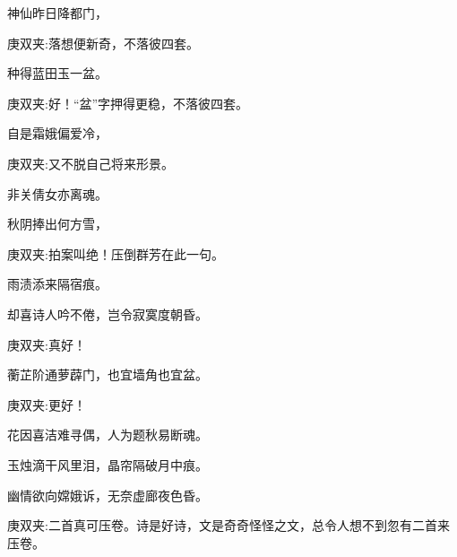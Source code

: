 \begin{poem}
    \begin{pl}神仙昨日降都门，\end{pl}
    \begin{note}庚双夹:落想便新奇，不落彼四套。\end{note}
    \begin{pl}种得蓝田玉一盆。\end{pl}
    \begin{note}庚双夹:好！“盆”字押得更稳，不落彼四套。\end{note}

    \begin{pl}自是霜娥偏爱冷，\end{pl}
    \begin{note}庚双夹:又不脱自己将来形景。\end{note}
    \begin{pl} 非关倩女亦离魂。\end{pl}

    \begin{pl}秋阴捧出何方雪，\end{pl}
    \begin{note}庚双夹:拍案叫绝！压倒群芳在此一句。\end{note}
    \begin{pl}雨渍添来隔宿痕。\end{pl}

    \begin{pl}却喜诗人吟不倦，岂令寂寞度朝昏。\end{pl}
    \begin{note}庚双夹:真好！\end{note}
    \emptypl

    \begin{pl}蘅芷阶通萝薜门，也宜墙角也宜盆。\end{pl}
    \begin{note}庚双夹:更好！\end{note}

    \begin{pl}花因喜洁难寻偶，人为题秋易断魂。\end{pl}

    \begin{pl}玉烛滴干风里泪，晶帘隔破月中痕。\end{pl}

    \begin{pl}幽情欲向嫦娥诉，无奈虚廊夜色昏。\end{pl}
    \begin{note}庚双夹:二首真可压卷。诗是好诗，文是奇奇怪怪之文，总令人想不到忽有二首来压卷。\end{note}
\end{poem}


